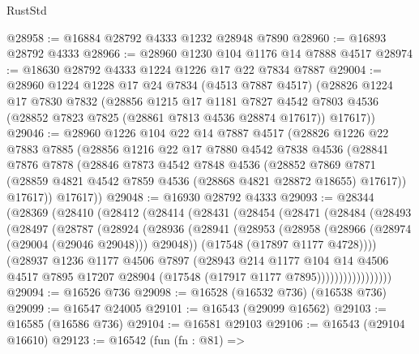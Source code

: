 \begin{lexlean}{RustStd}
\begin{coremodule}
@28958 := @16884 @28792 @4333 @1232 @28948 @7890
@28960 := @16893 @28792 @4333
@28966 := @28960 @1230 @104 @1176 @14 @7888 @4517
@28974 := @18630 @28792 @4333 @1224 @1226 @17 @22 @7834 @7887
@29004 := @28960
    @1224
    @1228
    @17
    @24
    @7834
    (@4513 @7887 @4517)
    (@28826
      @1224
      @17
      @7830
      @7832
      (@28856
        @1215
        @17
        @1181
        @7827
        @4542
        @7803
        @4536
        (@28852 @7823 @7825 (@28861 @7813 @4536 @28874 @17617))
        @17617))
@29046 := @28960
    @1226
    @104
    @22
    @14
    @7887
    @4517
    (@28826
      @1226
      @22
      @7883
      @7885
      (@28856
        @1216
        @22
        @17
        @7880
        @4542
        @7838
        @4536
        (@28841
          @7876
          @7878
          (@28846
            @7873
            @4542
            @7848
            @4536
            (@28852
              @7869
              @7871
              (@28859 @4821 @4542 @7859 @4536 (@28868 @4821 @28872 @18655) @17617))
            @17617))
        @17617))
@29048 := @16930 @28792 @4333
@29093 := @28344
    (@28369
      (@28410
        (@28412
          (@28414
            (@28431
              (@28454
                (@28471
                  (@28484
                    (@28493
                      (@28497
                        (@28787
                          (@28924
                            (@28936
                              (@28941
                                (@28953
                                  (@28958 (@28966 (@28974 (@29004 (@29046 @29048))) @29048))
                                  (@17548 (@17897 @1177 @4728))))
                              (@28937
                                @1236
                                @1177
                                @4506
                                @7897
                                (@28943
                                  @214
                                  @1177
                                  @104
                                  @14
                                  @4506
                                  @4517
                                  @7895
                                  @17207
                                  @28904
                                  (@17548 (@17917 @1177 @7895)))))))))))))))))
@29094 := @16526 @736
@29098 := @16528 (@16532 @736) (@16538 @736)
@29099 := @16547 @24005
@29101 := @16543 (@29099 @16562)
@29103 := @16585 (@16586 @736)
@29104 := @16581 @29103
@29106 := @16543 (@29104 @16610)
@29123 := @16542
    (fun (fn : @81) =>

\end{coremodule}
\end{lexlean}
